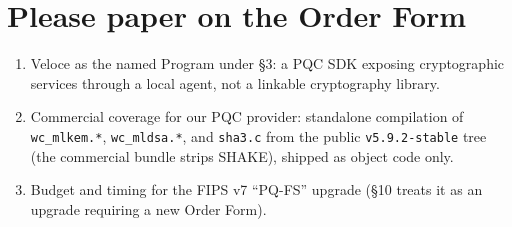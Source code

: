 \documentclass[10pt]{article}
\newcommand{\code}[1]{\texttt{\small #1}}
\begin{document}
\section{Please paper on the Order Form}

\begin{enumerate}
  \item Veloce as the named Program under \S3: a PQC SDK exposing
        cryptographic services through a local agent, not a linkable
        cryptography library.
  \item Commercial coverage for our PQC provider: standalone compilation of
        \code{wc\_mlkem.*}, \code{wc\_mldsa.*}, and \code{sha3.c} from the
        public \code{v5.9.2-stable} tree (the commercial bundle strips
        SHAKE), shipped as object code only.
  \item Budget and timing for the FIPS v7 ``PQ-FS'' upgrade (\S10 treats it
        as an upgrade requiring a new Order Form).
\end{enumerate}
\end{document}

